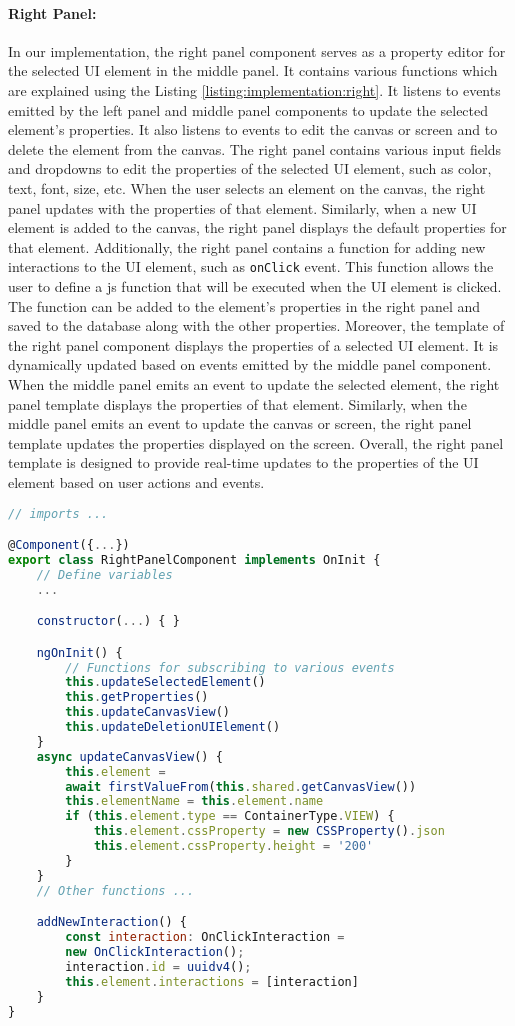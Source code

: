 \paragraph{Right Panel:}
In our implementation, the right panel component serves as a property editor for the selected UI element in the middle panel. 
It contains various functions which are explained using the Listing \ref{listing:implementation:right}.
It listens to events emitted by the left panel and middle panel components to update the selected element's properties. 
It also listens to events to edit the canvas or screen and to delete the element from the canvas.
The right panel contains various input fields and dropdowns to edit the properties of the selected UI element, such as color, text, font, size, etc. 
When the user selects an element on the canvas, the right panel updates with the properties of that element. 
Similarly, when a new UI element is added to the canvas, the right panel displays the default properties for that element.
Additionally, the right panel contains a function for adding new interactions to the UI element, such as \texttt{onClick} event. 
This function allows the user to define a \ac{js} function that will be executed when the UI element is clicked. 
The function can be added to the element's properties in the right panel and saved to the database along with the other properties.
Moreover, the template of the right panel component displays the properties of a selected UI element. 
It is dynamically updated based on events emitted by the middle panel component. 
When the middle panel emits an event to update the selected element, the right panel template displays the properties of that element. 
Similarly, when the middle panel emits an event to update the canvas or screen, the right panel template updates the properties displayed on the screen. 
Overall, the right panel template is designed to provide real-time updates to the properties of the UI element based on user actions and events.
\clearpage
\begin{lstlisting}[language=JavaScript, caption=The Typescript File for the Right Panel, label=listing:implementation:right]
// imports ...

@Component({...})
export class RightPanelComponent implements OnInit {
    // Define variables
    ...

    constructor(...) { }

    ngOnInit() {
        // Functions for subscribing to various events
        this.updateSelectedElement()
        this.getProperties()
        this.updateCanvasView()
        this.updateDeletionUIElement()
    }
    async updateCanvasView() {
        this.element = 
        await firstValueFrom(this.shared.getCanvasView())
        this.elementName = this.element.name
        if (this.element.type == ContainerType.VIEW) {
            this.element.cssProperty = new CSSProperty().json
            this.element.cssProperty.height = '200'
        }
    }
    // Other functions ...

    addNewInteraction() {
        const interaction: OnClickInteraction = 
        new OnClickInteraction();
        interaction.id = uuidv4();
        this.element.interactions = [interaction]
    }
}    
\end{lstlisting}
\clearpage
